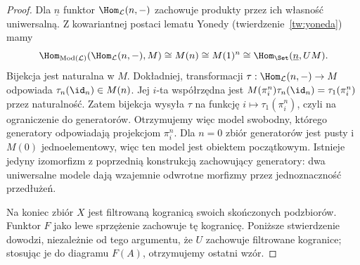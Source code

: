 \begin{proof}
Dla $\underline n$ funktor $\Hom_{\mathcal L}(n,-)$ zachowuje produkty przez ich własność uniwersalną. Z kowariantnej postaci lematu Yonedy (twierdzenie~\ref{tw:yoneda}) mamy
\[
 \Hom_{\operatorname{Mod}(\mathcal L)}(\Hom_{\mathcal L}(n,-),M)
 \cong M(n)\cong M(1)^n\cong\Hom_{\Set}(\underline n,UM).
\]
Bijekcja jest naturalna w $M$. Dokładniej, transformacji $\tau:\Hom_{\mathcal L}(n,-)\to M$ odpowiada $\tau_n(\id_n)\in M(n)$. Jej $i$-ta współrzędna jest $M(\pi_i^n)\tau_n(\id_n)=\tau_1(\pi_i^n)$ przez naturalność. Zatem bijekcja wysyła $\tau$ na funkcję $i\mapsto\tau_1(\pi_i^n)$, czyli na ograniczenie do generatorów. Otrzymujemy więc model swobodny, którego generatory odpowiadają projekcjom $\pi_i^n$. Dla $n=0$ zbiór generatorów jest pusty i $M(0)$ jednoelementowy, więc ten model jest obiektem początkowym. Istnieje jedyny izomorfizm z poprzednią konstrukcją zachowujący generatory: dwa uniwersalne modele dają wzajemnie odwrotne morfizmy przez jednoznaczność przedłużeń.

Na koniec zbiór $X$ jest filtrowaną kogranicą swoich skończonych podzbiorów. Funktor $F$ jako lewe sprzężenie zachowuje tę kogranicę. Poniższe stwierdzenie dowodzi, niezależnie od tego argumentu, że $U$ zachowuje filtrowane kogranice; stosując je do diagramu $F(A)$, otrzymujemy ostatni wzór.
\end{proof}

